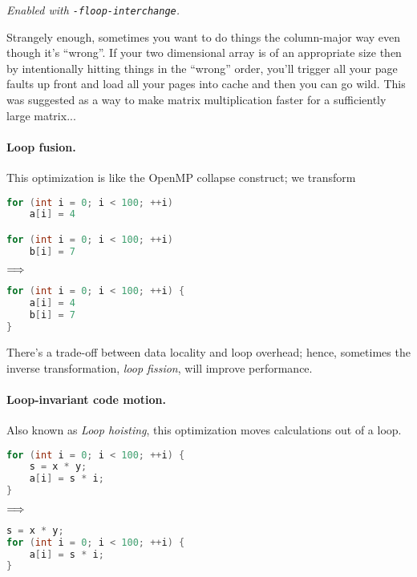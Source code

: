 \noindent
\emph{Enabled with {\tt -floop-interchange}.}

Strangely enough, sometimes you want to do things the column-major way even though it's ``wrong''. If your two dimensional array is of an appropriate size then by intentionally hitting things in the ``wrong'' order, you'll trigger all your page faults up front and load all your pages into cache and then you can go wild. This was suggested as a way to make matrix multiplication faster for a sufficiently large matrix...

\paragraph{Loop fusion.} This optimization is like the OpenMP collapse
construct; we transform
\begin{center}
\vspace*{-1em}
\begin{minipage}{.3\textwidth}
  \begin{lstlisting}[language=C]
for (int i = 0; i < 100; ++i)
    a[i] = 4

for (int i = 0; i < 100; ++i)
    b[i] = 7
  \end{lstlisting}
  \end{minipage} $\Longrightarrow \hspace*{2em}$ \begin{minipage}{.4\textwidth}
  \begin{lstlisting}[language=C]
for (int i = 0; i < 100; ++i) {
    a[i] = 4
    b[i] = 7
}
  \end{lstlisting}
  \end{minipage}
  \end{center}
There's a trade-off between data locality and loop overhead; hence,
sometimes the inverse transformation, \emph{loop fission}, will
improve performance.

\paragraph{Loop-invariant code motion.} Also known as \emph{Loop hoisting},
this optimization moves calculations out of a loop. 
\begin{center}
\vspace*{-1em}
\begin{minipage}{.3\textwidth}
  \begin{lstlisting}[language=C]
for (int i = 0; i < 100; ++i) {
    s = x * y;
    a[i] = s * i;
}
  \end{lstlisting}
  \end{minipage} $\Longrightarrow \hspace*{2em}$ \begin{minipage}{.4\textwidth}
  \begin{lstlisting}[language=C]
s = x * y;
for (int i = 0; i < 100; ++i) {
    a[i] = s * i;
}
  \end{lstlisting}
  \end{minipage}
  \end{center}

